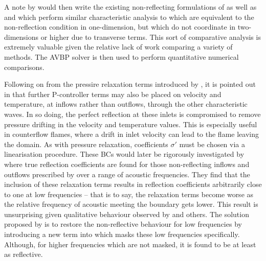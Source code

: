 A note by \cite{nicoud1999DefiningWaveAmplitude} would then write the existing non-reflecting formulations of \cite{thompson1990TimeDependentBoundaryConditions,poinsot1992BoundaryConditionsDirect} as well as \cite{hirsch1990NumericalComputationInternal} and \cite{giles1990NonreflectingBoundaryConditions} which perform similar characteristic analysis to \cite{thompson1990TimeDependentBoundaryConditions,poinsot1992BoundaryConditionsDirect} which are equivalent to the non-reflection condition  in one-dimension, but which do not coordinate in two-dimensions or higher due to transverse terms. This sort of comparative analysis is extremely valuable given the relative lack of work comparing a variety of methods. The AVBP solver \cite{cerfacsAVBP} is then used to perform quantitative numerical comparisons.

Following on from the pressire relaxation terms introduced by \cite{rudy1980NonreflectingOutflowBoundary}, it is pointed out in \cite{poinsot2001TheoreticalNumericalCombustion} that further P-controller terms may also be placed on velocity and temperature, at inflows rather than outflows, through the other characteristic waves. In so doing, the perfect reflection at these inlets is compromised to remove pressure drifting in the velocity and temperature values. This is especially useful in counterflow flames, where a drift in inlet velocity can lead to the flame leaving the domain. As with pressure relaxation, coefficients $σ'$ must be chosen via a linearisation procedure. These BCs would later be rigorously investigated by \cite{polifke2006PartiallyReflectingNonreflecting} where true reflection coefficients are found for those non-reflecting inflows and outflows prescribed by \cite{poinsot2001TheoreticalNumericalCombustion} over a range of acoustic frequencies. They find that the inclusion of these relaxation terms results in reflection coefficients arbitrarily close to one at low frequencies -- that is to say, the relaxation terms become worse as the relative frequency of acoustic meeting the boundary gets lower. This result is unsurprising given qualitative behaviour observed by \cite{poinsot1992BoundaryConditionsDirect} and others. The solution proposed by \cite{polifke2006PartiallyReflectingNonreflecting} is to restore the non-reflective behaviour for low frequencies by introducing a new term into  which masks these low frequencies specifically. Although, for higher frequencies which are not masked, it is found to be at least as reflective.

